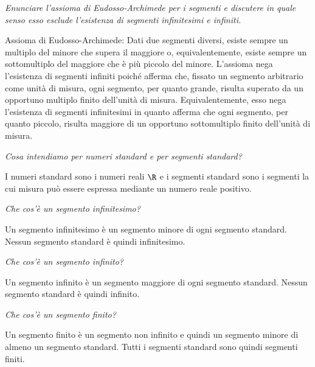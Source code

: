 \begin{esercizio}\label{ese:iper_001} 
\emph{Enunciare l'assioma di Eudosso-Archimede per i segmenti e 
discutere in quale senso esso esclude l'esistenza di segmenti infinitesimi 
e infiniti.}

Assioma di Eudosso-Archimede: Dati due segmenti diversi, esiste sempre un 
multiplo del minore che supera il maggiore o, equivalentemente, esiste 
sempre un sottomultiplo del maggiore che è più piccolo del minore.
L'assioma nega l'esistenza di segmenti infiniti poiché afferma che, fissato 
un segmento arbitrario come unità di misura, ogni segmento, per quanto 
grande, risulta superato da un opportuno multiplo finito dell'unità di 
misura. 
Equivalentemente, esso nega l'esistenza di segmenti infinitesimi in quanto 
afferma che ogni segmento, per quanto piccolo, risulta maggiore di un 
opportuno sottomultiplo finito dell'unità di misura.

\end{esercizio}

\begin{esercizio}\label{ese:iper_002} 
\noindent\emph{Cosa intendiamo per numeri standard e per segmenti standard?}

I numeri standard sono i numeri reali \(\R\) e i segmenti standard sono i 
segmenti la cui misura può essere espressa mediante un numero reale 
positivo.
\end{esercizio}

\begin{esercizio}\label{ese:iper_003} 
\emph{Che cos'è un segmento infinitesimo?}

Un segmento infinitesimo è un segmento minore di ogni segmento standard. 
Nessun segmento standard è quindi infinitesimo.
\end{esercizio}

\begin{esercizio}\label{ese:iper_004} 
\emph{Che cos'è un segmento infinito?}

Un segmento infinito è un segmento maggiore di ogni segmento standard. 
Nessun segmento standard è quindi infinito.
\end{esercizio}

\begin{esercizio}\label{ese:iper_005} 
\emph{Che cos'è un segmento finito?}

Un segmento finito è un segmento non infinito e quindi un segmento minore 
di almeno un segmento standard. 
Tutti i segmenti standard sono quindi segmenti finiti.
\end{esercizio}

